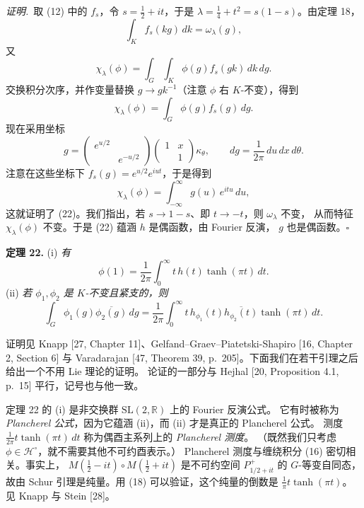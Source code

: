 \smallskip
\noindent\emph{证明.}\ 取 (12) 中的 $f_{s}$，令 $s=\tfrac12+it$，于是
$\lambda=\tfrac14+t^{2}=s(1-s)$。由定理 18，
\[
\int_{K}f_{s}(kg)\,dk=\omega_{\lambda}(g),
\]
又
\[
\chi_{\lambda}(\phi)=\int_{G}\int_{K}\phi(g)f_{s}(gk)\,dk\,dg .
\]
交换积分次序，并作变量替换 $g\to gk^{-1}$（注意 $\phi$ 右 $K$-不变），得到
\[
\chi_{\lambda}(\phi)=\int_{G}\phi(g)f_{s}(g)\,dg .
\]
现在采用坐标
\begin{equation}\tag{23}
g=\begin{pmatrix}e^{u/2}&\\&e^{-u/2}\end{pmatrix}
\begin{pmatrix}1&x\\&1\end{pmatrix}\kappa_{\theta},
\qquad dg=\frac{1}{2\pi}\,du\,dx\,d\theta .
\end{equation}
注意在这些坐标下 $f_{s}(g)=e^{u/2}e^{iut}$，于是得到
\[
\chi_{\lambda}(\phi)=\int_{-\infty}^{\infty}g(u)\,e^{itu}\,du,
\]
这就证明了 (22)。我们指出，若 $s\to1-s$、即 $t\to-t$，则 $\omega_{\lambda}$ 不变，
从而特征 $\chi_{\lambda}(\phi)$ 不变。于是 (22) 蕴涵 $h$ 是偶函数，由 Fourier 反演，
$g$ 也是偶函数。\hfill$\square$

\par\medskip\noindent\textbf{定理 22.}\quad
(i) \emph{有}
\[
\phi(1)=\frac{1}{2\pi}\int_{0}^{\infty}t\,h(t)\tanh(\pi t)\,dt .
\]
(ii) \emph{若 $\phi_{1},\phi_{2}$ 是 $K$-不变且紧支的，则}
\[
\int_{G}\phi_{1}(g)\overline{\phi_{2}(g)}\,dg
=\frac{1}{2\pi}\int_{0}^{\infty}t\,h_{\phi_{1}}(t)\overline{h_{\phi_{2}}(t)}
\tanh(\pi t)\,dt .
\]

\smallskip
证明见 Knapp [27, Chapter 11]、Gelfand--Graev--Piatetski-Shapiro [16, Chapter 2, Section 6]
与 Varadarajan [47, Theorem 39, p.\ 205]。下面我们在若干引理之后给出一个不用 Lie 理论的证明。
论证的一部分与 Hejhal [20, Proposition 4.1, p.\ 15] 平行，记号也与他一致。

定理 22 的 (i) 是非交换群 $\mathrm{SL}(2,\mathbb{R})$ 上的 Fourier 反演公式。
它有时被称为 \emph{Plancherel 公式}，因为它蕴涵 (ii)，而 (ii) 才是真正的 Plancherel 公式。
测度 $\frac{1}{2\pi}t\tanh(\pi t)\,dt$ 称为偶酉主系列上的 \emph{Plancherel 测度}。
（既然我们只考虑 $\phi\in\mathcal{H}^{\circ}$，就不需要其他不可约酉表示。）
Plancherel 测度与缠绕积分 (16) 密切相关。事实上，
$M(\tfrac12-it)\circ M(\tfrac12+it)$ 是不可约空间 $P_{1/2+it}^{+}$ 的 $G$-等变自同态，
故由 Schur 引理是纯量。用 (18) 可以验证，这个纯量的倒数是 $\frac{1}{\pi}t\tanh(\pi t)$。
见 Knapp 与 Stein [28]。

